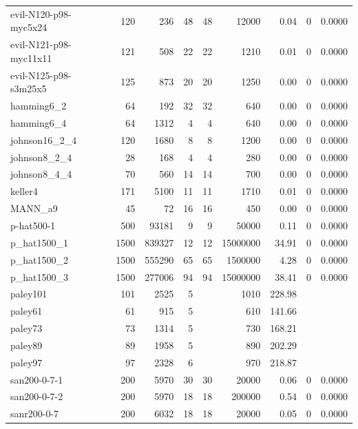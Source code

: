 {\begin{longtable}{lrrrrrrrr}
evil-N120-p98-myc5x24 & 120 & 236 & 48 & 48 & 12000 & 0.04 & 0 & 0.0000 \\
evil-N121-p98-myc11x11 & 121 & 508 & 22 & 22 & 1210 & 0.01 & 0 & 0.0000 \\
evil-N125-p98-s3m25x5 & 125 & 873 & 20 & 20 & 1250 & 0.00 & 0 & 0.0000 \\
hamming6\_2 & 64 & 192 & 32 & 32 & 640 & 0.00 & 0 & 0.0000 \\
hamming6\_4 & 64 & 1312 & 4 & 4 & 640 & 0.00 & 0 & 0.0000 \\
johnson16\_2\_4 & 120 & 1680 & 8 & 8 & 1200 & 0.00 & 0 & 0.0000 \\
johnson8\_2\_4 & 28 & 168 & 4 & 4 & 280 & 0.00 & 0 & 0.0000 \\
johnson8\_4\_4 & 70 & 560 & 14 & 14 & 700 & 0.00 & 0 & 0.0000 \\
keller4 & 171 & 5100 & 11 & 11 & 1710 & 0.01 & 0 & 0.0000 \\
MANN\_a9 & 45 & 72 & 16 & 16 & 450 & 0.00 & 0 & 0.0000 \\
p-hat500-1 & 500 & 93181 & 9 & 9 & 50000 & 0.11 & 0 & 0.0000 \\
p\_hat1500\_1 & 1500 & 839327 & 12 & 12 & 15000000 & 34.91 & 0 & 0.0000 \\
p\_hat1500\_2 & 1500 & 555290 & 65 & 65 & 1500000 & 4.28 & 0 & 0.0000 \\
p\_hat1500\_3 & 1500 & 277006 & 94 & 94 & 15000000 & 38.41 & 0 & 0.0000 \\
paley101 & 101 & 2525 & 5 &  & 1010 & 228.98 &  &  \\
paley61 & 61 & 915 & 5 &  & 610 & 141.66 &  &  \\
paley73 & 73 & 1314 & 5 &  & 730 & 168.21 &  &  \\
paley89 & 89 & 1958 & 5 &  & 890 & 202.29 &  &  \\
paley97 & 97 & 2328 & 6 &  & 970 & 218.87 &  &  \\
san200-0-7-1 & 200 & 5970 & 30 & 30 & 20000 & 0.06 & 0 & 0.0000 \\
san200-0-7-2 & 200 & 5970 & 18 & 18 & 200000 & 0.54 & 0 & 0.0000 \\
sanr200-0-7 & 200 & 6032 & 18 & 18 & 20000 & 0.05 & 0 & 0.0000 \\
\end{longtable}}


